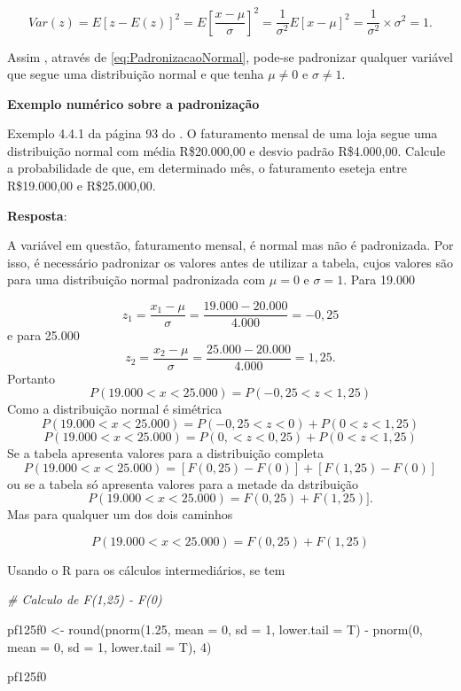 \documentclass[
]{book}
\newenvironment{Shaded}{\begin{snugshade}}{\end{snugshade}}
\newcommand{\AttributeTok}[1]{\textcolor[rgb]{0.77,0.63,0.00}{#1}}
\newcommand{\CommentTok}[1]{\textcolor[rgb]{0.56,0.35,0.01}{\textit{#1}}}
\newcommand{\DecValTok}[1]{\textcolor[rgb]{0.00,0.00,0.81}{#1}}
\newcommand{\FloatTok}[1]{\textcolor[rgb]{0.00,0.00,0.81}{#1}}
\newcommand{\FunctionTok}[1]{\textcolor[rgb]{0.00,0.00,0.00}{#1}}
\newcommand{\NormalTok}[1]{#1}
\newcommand{\OtherTok}[1]{\textcolor[rgb]{0.56,0.35,0.01}{#1}}
\newcommand{\SpecialCharTok}[1]{\textcolor[rgb]{0.00,0.00,0.00}{#1}}
\begin{document}
\[
  Var(z) = E[z - E(z)]^2 = E\left[\dfrac{x-\mu}{\sigma}\right]^2 =
  \dfrac{1}{\sigma^2} E[x - \mu]^2 = \dfrac{1}{\sigma^2}\times \sigma^2 = 1.
\]

Assim , através de \eqref{eq:PadronizacaoNormal}, pode-se padronizar qualquer variável que segue uma distribuição normal e que tenha \(\mu\neq 0\) e \(\sigma \neq 1\).

\textbf{Exemplo numérico sobre a padronização}

Exemplo 4.4.1 da página 93 do \citet{Sartoris2013}. O faturamento mensal de uma loja segue uma distribuição normal com média R\$20.000,00 e desvio padrão R\$4.000,00. Calcule a probabilidade de que, em determinado mês, o faturamento eseteja entre R\$19.000,00 e R\$25.000,00.

\textbf{Resposta}:

A variável em questão, faturamento mensal, é normal mas não é padronizada. Por isso, é necessário padronizar os valores antes de utilizar a tabela, cujos valores são para uma distribuição normal padronizada com \(\mu=0\) e \(\sigma =1\).
Para 19.000

\[
  z_1 = \dfrac{x_1 -\mu}{\sigma} = \dfrac{19.000 - 20.000}{4.000} = -0,25
\]
e para 25.000
\[
  z_2 = \dfrac{x_2 - \mu}{\sigma} = \dfrac{25.000-20.000}{4.000} = 1,25.
\]
Portanto
\[
  P(19.000 < x <25.000) = P(-0,25 < z < 1,25)
\]
Como a distribuição normal é simétrica
\[
  P(19.000 < x <25.000) = P(-0,25 < z < 0) + P(0 < z < 1,25)
\]
\[
  P(19.000 < x <25.000) = P(0,< z < 0,25) + P(0 < z < 1,25)
\]
Se a tabela apresenta valores para a distribuição completa
\[
  P(19.000 < x <25.000) = [F(0,25) - F(0)]  + [F(1,25) - F(0)]
\]
ou se a tabela só apresenta valores para a metade da dstribuição
\[
  P(19.000 < x <25.000) = F(0,25)  + F(1,25)].
\]
Mas para qualquer um dos dois caminhos

\[
  P(19.000 < x <25.000) = F(0,25)  +  F(1,25)
\]

Usando o R para os cálculos intermediários, se tem

\begin{Shaded}
\begin{Highlighting}[]
\CommentTok{\# Calculo de F(1,25) {-} F(0)}

\NormalTok{pf125f0 }\OtherTok{\textless{}{-}} \FunctionTok{round}\NormalTok{(}\FunctionTok{pnorm}\NormalTok{(}\FloatTok{1.25}\NormalTok{, }\AttributeTok{mean =} \DecValTok{0}\NormalTok{, }\AttributeTok{sd =} \DecValTok{1}\NormalTok{, }\AttributeTok{lower.tail =}\NormalTok{ T) }\SpecialCharTok{{-}} 
    \FunctionTok{pnorm}\NormalTok{(}\DecValTok{0}\NormalTok{, }\AttributeTok{mean =} \DecValTok{0}\NormalTok{, }\AttributeTok{sd =} \DecValTok{1}\NormalTok{, }\AttributeTok{lower.tail =}\NormalTok{ T), }\DecValTok{4}\NormalTok{)}

\NormalTok{pf125f0}
\end{Highlighting}
\end{Shaded}
\end{document}

